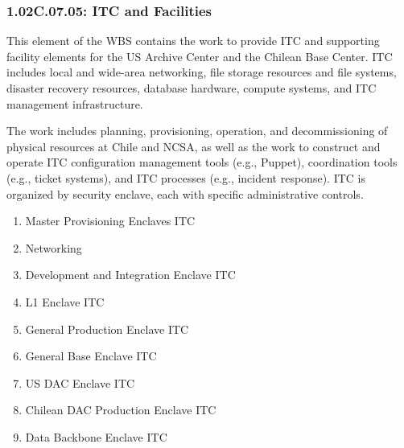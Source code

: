 \subsubsection*{1.02C.07.05: ITC and Facilities}

This element of the WBS contains the work to provide ITC and supporting facility elements for the US Archive Center and the Chilean Base Center.
ITC includes local and wide-area networking, file storage resources and file systems, disaster recovery resources, database hardware, compute systems, and ITC management infrastructure.

The work includes planning, provisioning, operation, and decommissioning of physical resources at Chile and NCSA, as well as the work to construct and operate ITC configuration management tools (e.g., Puppet), coordination tools (e.g., ticket systems), and ITC processes (e.g., incident response).
ITC is organized by security enclave, each with specific administrative controls.

\begin{enumerate}

  \item{Master Provisioning Enclaves ITC}
  \item{Networking}
  \item{Development and Integration Enclave ITC}
  \item{L1 Enclave ITC}
  \item{General Production Enclave ITC}
  \item{General Base Enclave ITC}
  \item{US DAC Enclave ITC}
  \item{Chilean DAC Production Enclave ITC}
  \item{Data Backbone Enclave ITC}

\end{enumerate}
